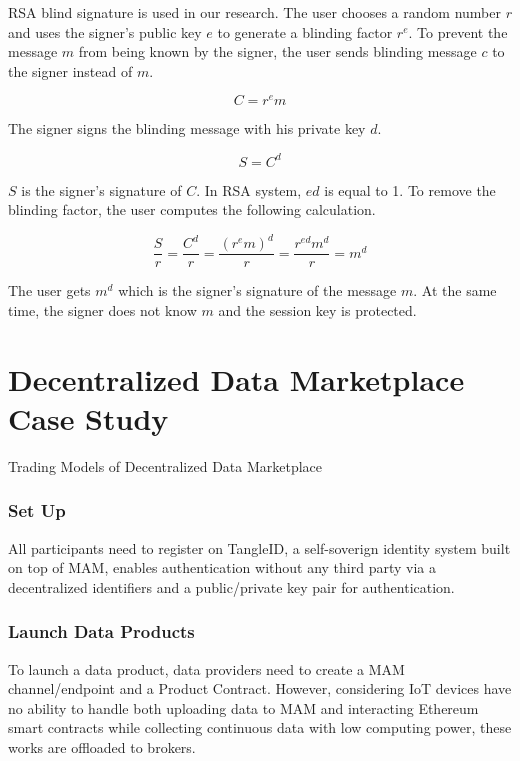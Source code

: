 \documentclass[conference]{IEEEtran}
\begin{document}
RSA blind signature\cite{cryptoNote} is used in our research. The user chooses a random number $r$ and uses the signer's public key $e$ to generate a blinding factor $r^e$. To prevent the message $m$ from being known by the signer, the user sends blinding message $c$ to the signer instead of $m$.

\begin{equation}
C = r^e m
\end{equation}

The signer signs the blinding message with his private key $d$.

\begin{equation}
S = C^d
\end{equation}

$S$ is the signer's signature of $C$. In RSA system, $ed$ is equal to 1. To remove the blinding factor, the user computes the following calculation.

\begin{equation}
\frac{S}{r}= \frac{C^d}{r} = \frac{(r^e m)^d}{r} = \frac{r^{ed} m^d}{r} = m^d
\end{equation}
 
The user gets $m^d$ which is the signer's signature of the message $m$. At the same time, the signer does not know $m$ and the session key is protected. 


\section{Decentralized Data Marketplace Case Study}
Trading Models of Decentralized Data Marketplace
\subsubsection{Set Up}
All participants need to register on TangleID\cite{TangleID}, a self-soverign identity system built on top of MAM, enables authentication without any third party via a decentralized identifiers and a public/private key pair for authentication. 

\subsubsection{Launch Data Products}
To launch a data product, data providers need to create a MAM channel/endpoint and a Product Contract. However, considering IoT devices have no ability to handle both uploading data to MAM and interacting Ethereum smart contracts while collecting continuous data with low computing power, these works are offloaded to brokers. 
\end{document}
